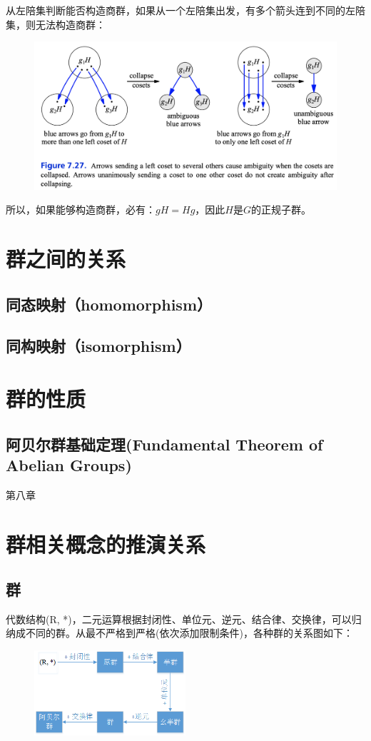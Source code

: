 \documentclass[12pt]{article}
\begin{document}
从左陪集判断能否构造商群，如果从一个左陪集出发，有多个箭头连到不同的左陪集，则无法构造商群：
\begin{figure}[H]
    \centering
    \includegraphics[width=1\textwidth]{fig/Group/Cayley-left-coset-quotient.png}
\end{figure}

所以，如果能够构造商群，必有：$gH = Hg$，因此$H$是$G$的正规子群。


\section{群之间的关系}
\subsection{同态映射（homomorphism）}
\subsection{同构映射（isomorphism）}

\section{群的性质}

\subsection{阿贝尔群基础定理(Fundamental Theorem of Abelian Groups)}
第八章

\section{群相关概念的推演关系\cite{Introduction_Of_Algebra_Structure}}
\subsection{群}
代数结构(R, *)，二元运算根据封闭性、单位元、逆元、结合律、交换律，可以归纳成不同的群。从最不严格到严格(依次添加限制条件)，各种群的关系图如下：
\begin{figure}[H]
    \centering
    \includegraphics[width=0.5\textwidth]{fig/GroupLikeRelations.png}
\end{figure}
\end{document}
